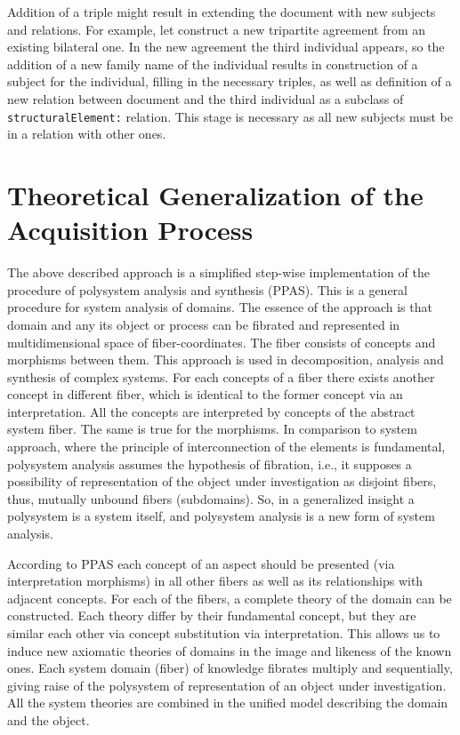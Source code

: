 \documentclass[conference]{IEEEtran}
\begin{document}
Addition of a triple might result in extending the document with new
subjects and relations.  For example, let construct a new tripartite
agreement from an existing bilateral one.  In the new agreement the
third individual appears, so the addition of a new family name of the
individual results in construction of a subject for the individual,
filling in the necessary triples, as well as definition of a new
relation between document and the third individual as a subclass of
\texttt{structuralElement:} relation.  This stage is necessary as all
new subjects must be in a relation with other ones.

\section{Theoretical Generalization of the Acquisition Process}

The above described approach is a simplified step-wise implementation
of the procedure of polysystem analysis and synthesis \cite{father}
(PPAS).  This is a general procedure for system analysis of domains.
The essence of the approach is that domain and any its object or
process can be fibrated and represented in multidimensional space of
fiber-coordinates.  The fiber consists of concepts and morphisms
between them.  This approach is used in decomposition, analysis and
synthesis of complex systems.  For each concepts of a fiber there
exists another concept in different fiber, which is identical to the
former concept via an interpretation.  All the concepts are
interpreted by concepts of the abstract system fiber.  The same is
true for the morphisms.  In comparison to system approach, where the
principle of interconnection of the elements is fundamental,
polysystem analysis assumes the hypothesis of fibration, i.e., it
supposes a possibility of representation of the object under
investigation as disjoint fibers, thus, mutually unbound fibers
(subdomains).  So, in a generalized insight a polysystem is a system
itself, and polysystem analysis is a new form of system analysis.

According to PPAS \cite{father} each concept of an aspect should be
presented (via interpretation morphisms) in all other fibers as well
as its relationships with adjacent concepts.  For each of the fibers,
a complete theory of the domain can be constructed.  Each theory
differ by their fundamental concept, but they are similar each other
via concept substitution via interpretation.  This allows us to induce
new axiomatic theories of domains in the image and likeness of the
known ones.  Each system domain (fiber) of knowledge fibrates multiply
and sequentially, giving raise of the polysystem of representation of
an object under investigation.  All the system theories are combined
in the unified model describing the domain and the object.
\end{document}
